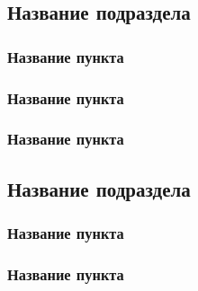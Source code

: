 \subsection{Название подраздела}

\subsubsection{Название пункта}



\subsubsection{Название пункта}



\subsubsection{Название пункта}



\subsection{Название подраздела}

\subsubsection{Название пункта}



\subsubsection{Название пункта}


